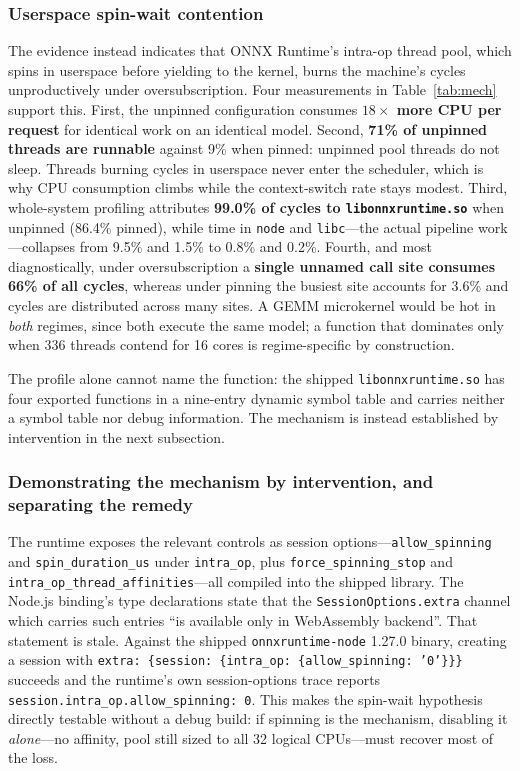 \documentclass[conference]{IEEEtran}
\begin{document}
\subsubsection{Userspace spin-wait contention}
The evidence instead indicates that ONNX Runtime's intra-op thread pool, which spins in userspace before yielding to the kernel, burns the machine's cycles unproductively under oversubscription. Four measurements in Table~\ref{tab:mech} support this. First, the unpinned configuration consumes \textbf{$18\times$ more CPU per request} for identical work on an identical model. Second, \textbf{71\% of unpinned threads are runnable} against 9\% when pinned: unpinned pool threads do not sleep. Threads burning cycles in userspace never enter the scheduler, which is why CPU consumption climbs while the context-switch rate stays modest. Third, whole-system profiling attributes \textbf{99.0\% of cycles to \texttt{libonnxruntime.so}} when unpinned (86.4\% pinned), while time in \texttt{node} and \texttt{libc}---the actual pipeline work---collapses from 9.5\% and 1.5\% to 0.8\% and 0.2\%. Fourth, and most diagnostically, under oversubscription a \textbf{single unnamed call site consumes 66\% of all cycles}, whereas under pinning the busiest site accounts for 3.6\% and cycles are distributed across many sites. A GEMM microkernel would be hot in \emph{both} regimes, since both execute the same model; a function that dominates only when 336 threads contend for 16 cores is regime-specific by construction.

The profile alone cannot name the function: the shipped \texttt{libonnxruntime.so} has four exported functions in a nine-entry dynamic symbol table and carries neither a symbol table nor debug information. The mechanism is instead established by intervention in the next subsection.

\subsubsection{Demonstrating the mechanism by intervention, and separating the remedy}
\label{sec:mitigation}
The runtime exposes the relevant controls as session options---\texttt{allow\_spinning} and \texttt{spin\_duration\_us} under \texttt{intra\_op}, plus \texttt{force\_spinning\_stop} and \texttt{intra\_op\_thread\_affinities}---all compiled into the shipped library. The Node.js binding's type declarations state that the \texttt{SessionOptions.extra} channel which carries such entries ``is available only in WebAssembly backend''. That statement is stale. Against the shipped \texttt{onnxruntime-node} 1.27.0 binary, creating a session with \texttt{extra: \{session: \{intra\_op: \{allow\_spinning: '0'\}\}\}} succeeds and the runtime's own session-options trace reports \texttt{session.intra\_op.allow\_spinning: 0}. This makes the spin-wait hypothesis directly testable without a debug build: if spinning is the mechanism, disabling it \emph{alone}---no affinity, pool still sized to all 32 logical CPUs---must recover most of the loss.
\end{document}
